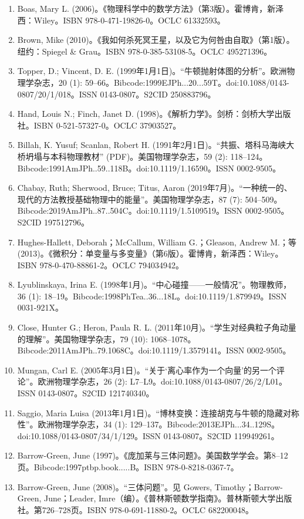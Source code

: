 \begin{enumerate}
\item Boas, Mary L. (2006)。《物理科学中的数学方法》（第3版）。霍博肯，新泽西：Wiley。ISBN 978-0-471-19826-0。OCLC 61332593。
\item Brown, Mike (2010)。《我如何杀死冥王星，以及它为何咎由自取》（第1版）。纽约：Spiegel & Grau。ISBN 978-0-385-53108-5。OCLC 495271396。
\item Topper, D.; Vincent, D. E. (1999年1月1日)。“牛顿抛射体图的分析”。欧洲物理学杂志，20 (1): 59–66。Bibcode:1999EJPh...20...59T。doi:10.1088/0143-0807/20/1/018。ISSN 0143-0807。S2CID 250883796。
\item Hand, Louis N.; Finch, Janet D. (1998)。《解析力学》。剑桥：剑桥大学出版社。ISBN 0-521-57327-0。OCLC 37903527。
\item Billah, K. Yusuf; Scanlan, Robert H. (1991年2月1日)。“共振、塔科马海峡大桥坍塌与本科物理教材” (PDF)。美国物理学杂志，59 (2): 118–124。Bibcode:1991AmJPh..59..118B。doi:10.1119/1.16590。ISSN 0002-9505。
\item Chabay, Ruth; Sherwood, Bruce; Titus, Aaron (2019年7月)。“一种统一的、现代的方法教授基础物理中的能量”。美国物理学杂志，87 (7): 504–509。Bibcode:2019AmJPh..87..504C。doi:10.1119/1.5109519。ISSN 0002-9505。S2CID 197512796。
\item Hughes-Hallett, Deborah；McCallum, William G.；Gleason, Andrew M.；等 (2013)。《微积分：单变量与多变量》（第6版）。霍博肯，新泽西：Wiley。ISBN 978-0-470-88861-2。OCLC 794034942。
\item Lyublinskaya, Irina E. (1998年1月)。“中心碰撞——一般情况”。物理教师，36 (1): 18–19。Bibcode:1998PhTea..36...18L。doi:10.1119/1.879949。ISSN 0031-921X。
\item Close, Hunter G.; Heron, Paula R. L. (2011年10月)。“学生对经典粒子角动量的理解”。美国物理学杂志，79 (10): 1068–1078。Bibcode:2011AmJPh..79.1068C。doi:10.1119/1.3579141。ISSN 0002-9505。
\item Mungan, Carl E. (2005年3月1日)。“关于‘离心率作为一个向量’的另一个评论”。欧洲物理学杂志，26 (2): L7–L9。doi:10.1088/0143-0807/26/2/L01。ISSN 0143-0807。S2CID 121740340。
\item Saggio, Maria Luisa (2013年1月1日)。“博林变换：连接胡克与牛顿的隐藏对称性”。欧洲物理学杂志，34 (1): 129–137。Bibcode:2013EJPh...34..129S。doi:10.1088/0143-0807/34/1/129。ISSN 0143-0807。S2CID 119949261。
\item Barrow-Green, June (1997)。《庞加莱与三体问题》。美国数学学会。第8–12页。Bibcode:1997ptbp.book.....B。ISBN 978-0-8218-0367-7。
\item Barrow-Green, June (2008)。“三体问题”。见 Gowers, Timothy；Barrow-Green, June；Leader, Imre（编）。《普林斯顿数学指南》。普林斯顿大学出版社。第726–728页。ISBN 978-0-691-11880-2。OCLC 682200048。

\end{enumerate}
